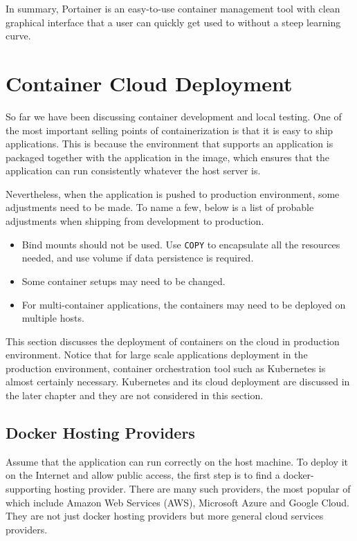 In summary, Portainer is an easy-to-use container management tool with clean graphical interface that a user can quickly get used to without a steep learning curve.

\section{Container Cloud Deployment}

So far we have been discussing container development and local testing. One of the most important selling points of containerization is that it is easy to ship applications. This is because the environment that supports an application is packaged together with the application in the image, which ensures that the application can run consistently whatever the host server is. 

Nevertheless, when the application is pushed to production environment, some adjustments need to be made. To name a few, below is a list of probable adjustments when shipping from development to production.

\begin{itemize}
	\item Bind mounts should not be used. Use \verb|COPY| to encapsulate all the resources needed, and use volume if data persistence is required.
	\item Some container setups may need to be changed.
	\item For multi-container applications, the containers may need to be deployed on multiple hosts.
\end{itemize}

This section discusses the deployment of containers on the cloud in production environment. Notice that for large scale applications deployment in the production environment, container orchestration tool such as Kubernetes is almost certainly necessary. Kubernetes and its cloud deployment are discussed in the later chapter and they are not considered in this section. 

\subsection{Docker Hosting Providers}

Assume that the application can run correctly on the host machine. To deploy it on the Internet and allow public access, the first step is to find a docker-supporting hosting provider. There are many such providers, the most popular of which include Amazon Web Services (AWS), Microsoft Azure and Google Cloud. They are not just docker hosting providers but more general cloud services providers.

